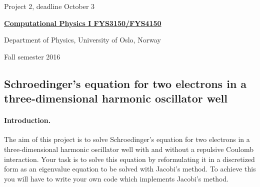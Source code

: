 \documentclass[%
oneside,                 %
final,                   %
10pt]{article}
\begin{document}

\newcommand{\exercisesection}[1]{\subsection*{#1}}






\thispagestyle{empty}

\begin{center}
{\LARGE\bf
\begin{spacing}{1.25}
Project 2, deadline  October 3
\end{spacing}
}
\end{center}


\begin{center}
{\bf \href{{http://www.uio.no/studier/emner/matnat/fys/FYS3150/index-eng.html}}{Computational Physics I FYS3150/FYS4150}}
\end{center}

    \begin{center}
\centerline{{\small Department of Physics, University of Oslo, Norway}}
\end{center}
    

\begin{center}
Fall semester 2016
\end{center}

\vspace{1cm}


\subsection*{Schroedinger's equation for two electrons in a three-dimensional harmonic oscillator well}

\paragraph{Introduction.}
The aim of this project is to solve Schroedinger's equation for two
electrons in a three-dimensional harmonic oscillator well with and
without a repulsive Coulomb interaction.  Your task is to solve this
equation by reformulating it in a discretized form as an eigenvalue
equation to be solved with Jacobi's method. To achieve this you will
have to write your own code which implements Jacobi's method.
\end{document}
